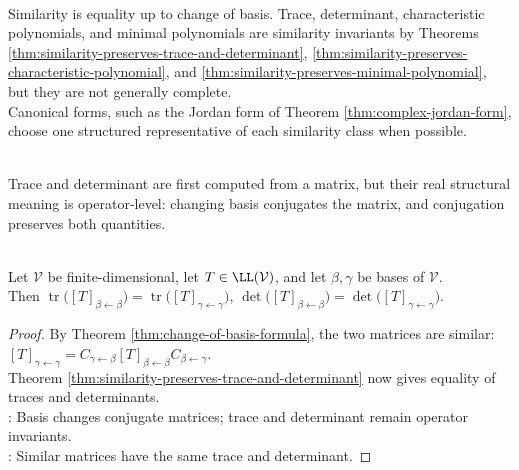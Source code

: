 \begin{perspective} \label{per:similarity-invariants-and-canonical-forms} \\
Similarity is equality up to change of basis. Trace, determinant, characteristic polynomials, and minimal polynomials are similarity invariants by Theorems \ref{thm:similarity-preserves-trace-and-determinant}, \ref{thm:similarity-preserves-characteristic-polynomial}, and \ref{thm:similarity-preserves-minimal-polynomial}, but they are not generally complete.\\
Canonical forms, such as the Jordan form of Theorem \ref{thm:complex-jordan-form}, choose one structured representative of each similarity class when possible.
\end{perspective}

\begin{principle} \label{princ:trace-determinant-coordinate-free} \\
Trace and determinant are first computed from a matrix, but their real structural meaning is operator-level: changing basis conjugates the matrix, and conjugation preserves both quantities.
\end{principle}

\begin{theorem} \label{thm:operator-matrix-trace-determinant-basis-independent} \\
Let $\mathcal{V}$ be finite-dimensional, let $T\in\LL(\mathcal{V})$, and let $\beta,\gamma$ be bases of $\mathcal{V}$.\\
Then $\operatorname{tr}\bigl([T]_{\beta\leftarrow\beta}\bigr) =\operatorname{tr}\bigl([T]_{\gamma\leftarrow\gamma}\bigr)$, $\det\bigl([T]_{\beta\leftarrow\beta}\bigr) =\det\bigl([T]_{\gamma\leftarrow\gamma}\bigr)$.
\begin{proof}
By Theorem \ref{thm:change-of-basis-formula}, the two matrices are similar: $[T]_{\gamma\leftarrow\gamma} =C_{\gamma\leftarrow\beta}[T]_{\beta\leftarrow\beta}C_{\beta\leftarrow\gamma}$.\\
Theorem \ref{thm:similarity-preserves-trace-and-determinant} now gives equality of traces and determinants.\\
: Basis changes conjugate matrices; trace and determinant remain operator invariants.\\
: Similar matrices have the same trace and determinant.
\end{proof}
\end{theorem}

